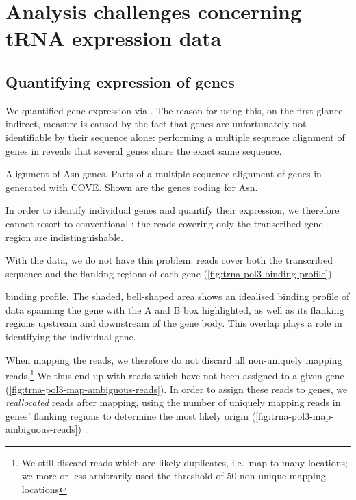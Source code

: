 \chapter{Analysis challenges concerning tRNA expression data}

\section{Quantifying expression of \trna genes}

We quantified \trna gene expression via  \chipseq. The reason for using
this, on the first glance indirect, measure is caused by the fact that \trna
genes are unfortunately not identifiable by their sequence alone: performing a
multiple sequence alignment of \trna genes in \mmu reveals that several \trna
genes share the exact same sequence.

    {\footnotesize}
    {Alignment of Asn \trna genes.}
    {Parts of a multiple sequence alignment of \trna genes in \mmu generated
    with COVE\@. Shown are the \trna genes coding for Asn.}

In order to identify individual \trna genes and quantify their expression, we
therefore cannot resort to conventional \rnaseq: the \rna reads covering only
the transcribed gene region are indistinguishable.

With the  \chipseq data, we do not have this problem: reads cover both the
transcribed sequence and the flanking regions of each gene
(\cref{fig:trna-pol3-binding-profile}).

    {\trna {} \chip binding profile.}
    {The shaded, bell-shaped area shows an idealised binding profile of \chipseq
    data spanning the \trna gene with the A and B box highlighted, as well as
    its flanking regions upstream and downstream of the gene body. This overlap
    plays a role in identifying the individual gene.}

When mapping the reads, we therefore do not discard all non-uniquely mapping
reads.\footnote{We still discard reads which are likely \pcr duplicates, i.e.\
map to many locations; we more or less arbitrarily used the threshold of
\num{50} non-unique mapping locations} We thus end up with reads which have not
been assigned to a given \trna gene (\cref{fig:trna-pol3-map-ambiguous-reads}).
In order to assign these reads to \trna genes, we \emph{reallocated} reads after
mapping, using the number of uniquely mapping reads in \trna genes’ flanking
regions to determine the most likely origin
(\cref{fig:trna-pol3-map-ambiguous-reads}) \citep{Kutter:2011}.

